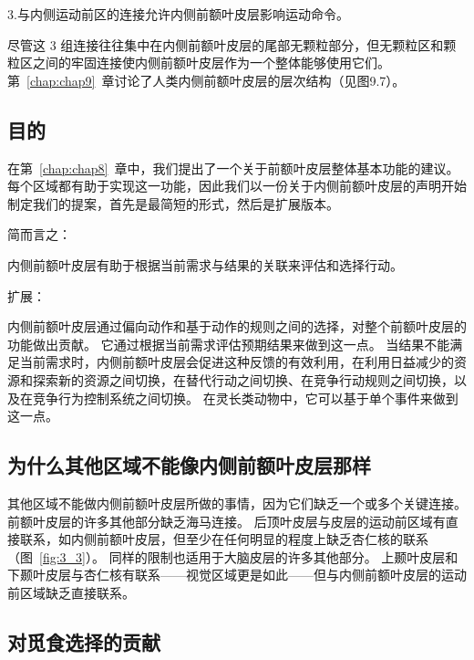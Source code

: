 3.与内侧运动前区的连接允许内侧前额叶皮层影响运动命令。\par

尽管这 3 组连接往往集中在内侧前额叶皮层的尾部无颗粒部分，但无颗粒区和颗粒区之间的牢固连接使内侧前额叶皮层作为一个整体能够使用它们。
第~\ref{chap:chap9}~章讨论了人类内侧前额叶皮层的层次结构（见图9.7）。\par



\subsection{目的}

在第~\ref{chap:chap8}~章中，我们提出了一个关于前额叶皮层整体基本功能的建议。
每个区域都有助于实现这一功能，因此我们以一份关于内侧前额叶皮层的声明开始制定我们的提案，首先是最简短的形式，然后是扩展版本。\par


简而言之：\par
内侧前额叶皮层有助于根据当前需求与结果的关联来评估和选择行动。\par
扩展：\par
内侧前额叶皮层通过偏向动作和基于动作的规则之间的选择，对整个前额叶皮层的功能做出贡献。
它通过根据当前需求评估预期结果来做到这一点。
当结果不能满足当前需求时，内侧前额叶皮层会促进这种反馈的有效利用，在利用日益减少的资源和探索新的资源之间切换，在替代行动之间切换、在竞争行动规则之间切换，以及在竞争行为控制系统之间切换。
在灵长类动物中，它可以基于单个事件来做到这一点。\par



\subsection{为什么其他区域不能像内侧前额叶皮层那样}

其他区域不能做内侧前额叶皮层所做的事情，因为它们缺乏一个或多个关键连接。
前额叶皮层的许多其他部分缺乏海马连接。
后顶叶皮层与皮层的运动前区域有直接联系，如内侧前额叶皮层，但至少在任何明显的程度上缺乏杏仁核的联系（图~\ref{fig:3_3}）。
同样的限制也适用于大脑皮层的许多其他部分。
上颞叶皮层和下颞叶皮层与杏仁核有联系——视觉区域更是如此——但与内侧前额叶皮层的运动前区域缺乏直接联系。\par



\subsection{对觅食选择的贡献}

